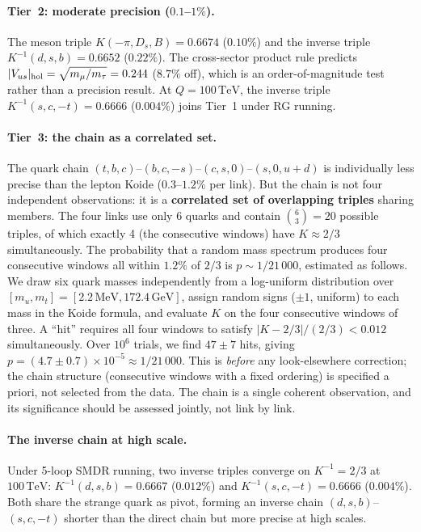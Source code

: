 \documentclass[aps,prd,twocolumn,showpacs,preprintnumbers,superscriptaddress,floatfix]{revtex4-2}
\newcommand{\MeV}{\,\mathrm{MeV}}
\newcommand{\GeV}{\,\mathrm{GeV}}
\newcommand{\TeV}{\,\mathrm{TeV}}
\begin{document}
\paragraph{Tier~2: moderate precision ($0.1$--$1\%$).}
The meson triple $K(-\pi, D_s, B) = 0.6674$ ($0.10\%$) and the
inverse triple $K^{-1}(d,s,b) = 0.6652$ ($0.22\%$).
The cross-sector product rule predicts
$|V_{us}|_{\rm hol} = \sqrt{m_\mu/m_\tau} = 0.244$ ($8.7\%$ off),
which is an order-of-magnitude test rather than a precision result.
At $Q = 100\TeV$, the inverse triple $K^{-1}(s,c,-t) = 0.6666$
($0.004\%$) joins Tier~1 under RG running.

\paragraph{Tier~3: the chain as a correlated set.}
The quark chain $(t,b,c)$--$(b,c,-s)$--$(c,s,0)$--$(s,0,u{+}d)$
is individually less precise than the lepton Koide ($0.3$--$1.2\%$
per link).
But the chain is not four independent observations: it is a
\textbf{correlated set of overlapping triples} sharing members.
The four links use only 6 quarks and contain
$\binom{6}{3} = 20$ possible triples, of which exactly 4
(the consecutive windows) have $K \approx 2/3$ simultaneously.
The probability that a random mass spectrum produces four
consecutive windows all within $1.2\%$ of $2/3$ is
$p \sim 1/21\,000$, estimated as follows.
We draw six quark masses independently from a log-uniform
distribution over $[m_u, m_t] = [2.2\MeV, 172.4\GeV]$, assign
random signs ($\pm 1$, uniform) to each mass in the Koide formula,
and evaluate $K$ on the four consecutive windows of three.
A ``hit'' requires all four windows to satisfy
$|K - 2/3|/(2/3) < 0.012$ simultaneously.
Over $10^6$ trials, we find $47 \pm 7$ hits, giving
$p = (4.7 \pm 0.7) \times 10^{-5} \approx 1/21\,000$.
This is \emph{before} any look-elsewhere correction; the chain
structure (consecutive windows with a fixed ordering) is
specified a priori, not selected from the data.
The chain is a single coherent observation, and its significance
should be assessed jointly, not link by link.

\paragraph{The inverse chain at high scale.}
Under 5-loop SMDR running, two inverse triples converge on
$K^{-1} = 2/3$ at $100\TeV$:
$K^{-1}(d,s,b) = 0.6667$ ($0.012\%$) and
$K^{-1}(s,c,-t) = 0.6666$ ($0.004\%$).
Both share the strange quark as pivot, forming an inverse chain
$(d,s,b)$--$(s,c,-t)$ shorter than the direct chain but more
precise at high scales.
\end{document}
